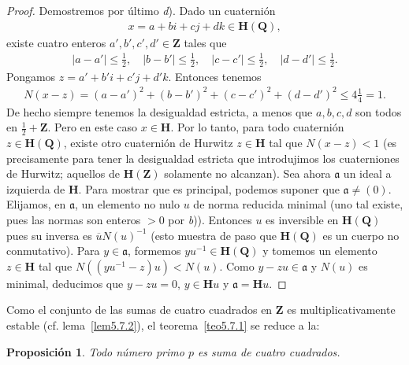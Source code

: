 \documentclass[10pt,oneside,bibtotoc,smallheadings,leqno,a5paper,DIV=12]{scrbook}
\newcommand{\QQ}{\mathbf{Q}}
\newcommand{\ZZ}{\mathbf{Z}}
\newcommand{\HH}{\mathbf{H}}
\newcommand{\idl}[1]{\mathfrak{#1}}
\newcommand{\QED}{}%
\newcommand{\oline}[1]{\overline{#1}}
\newcommand{\abs}[1]{\left\lvert#1\right\rvert}
\numberwithin{equation}{section}
\theoremstyle{defi}
\theoremstyle{enonce}
\newtheorem{proposition}{Proposici\'on}
\theoremstyle{rem}
\numberwithin{theorem}{section}
\numberwithin{proposition}{section}
\numberwithin{definition}{section}
\numberwithin{lemma}{section}
\numberwithin{corollary}{section}
\numberwithin{example}{section}
\numberwithin{footnote}{section}%
\begin{document}
\begin{proof}
Demostremos por \'ultimo {\itshape d}). Dado un cuaterni\'on
\begin{gather*}
x=a+bi+cj+dk\in\HH(\QQ),
\end{gather*}
existe cuatro enteros $a',b',c',d'\in\ZZ$ tales que
\begin{gather*}
\abs{a-a'}\leq\frac{1}{2},\quad\abs{b-b'}\leq\frac{1}{2},\quad\abs{c-c'}\leq\frac{1}{2},\quad
\abs{d-d'}\leq\frac{1}{2}.
\end{gather*}
Pongamos $z = a'+b'i+c'j+d'k$. Entonces tenemos
\begin{gather*}
N(x-z) = (a-a')^{2}+(b-b')^{2}+(c-c')^{2}+(d-d')^{2}\leq 4\frac{1}{4}=1.
\end{gather*}
De hecho siempre tenemos la desigualdad estricta, a menos que $a,b,c,d$ son todos en $\frac{1}{2}+\ZZ$.
Pero en este caso $x\in\HH$. Por lo tanto, para todo cuaterni\'on $z\in\HH(\QQ)$, existe otro cuaterni\'on de
Hurwitz $z\in\HH$ tal que $N(x-z) < 1$ (es precisamente para tener la desigualdad estricta que introdujimos
los cuaterniones de Hurwitz; aquellos de $\HH(\ZZ)$ solamente no alcanzan). Sea ahora $\idl{a}$ un
ideal a izquierda de $\HH$. Para mostrar que es principal, podemos suponer que $\idl{a}\neq(0)$. Elijamos,
en $\idl{a}$, un elemento no nulo $u$ de norma reducida minimal (uno tal existe, pues las normas son
enteros $>0$ por {\itshape b})). Entonces $u$ es inversible en $\HH(\QQ)$ pues su inversa es
$\oline uN(u)^{-1}$ (esto muestra de paso que $\HH(\QQ)$ es un cuerpo no conmutativo). Para $y\in\idl{a}$,
formemos $yu^{-1}\in\HH(\QQ)$ y tomemos un elemento $z\in\HH$ tal que $N((yu^{-1}-z)u)<N(u)$.
Como $y-zu\in\idl{a}$ y $N(u)$ es minimal, deducimos que $y-zu=0$, $y\in\HH u$ y $\idl{a} = \HH u$. \QED
\end{proof}

Como el conjunto de las sumas de cuatro cuadrados en $\ZZ$ es multiplicativamente estable
(cf. lema~\ref{lem5.7.2}), el teorema~\ref{teo5.7.1} se reduce a la:

\begin{proposition}
Todo n\'umero primo $p$ es suma de cuatro cuadrados.
\end{proposition}
\end{document}
